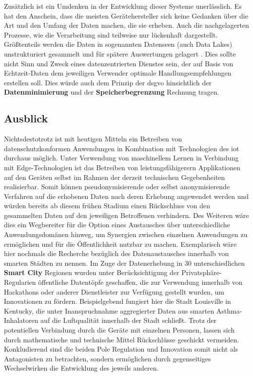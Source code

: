 Zusätzlich ist ein Umdenken in der Entwicklung dieser Systeme unerlässlich. Es hat den Anschein, dass die meisten Gerätehersteller sich keine Gedanken über die Art und den Umfang der Daten machen, die sie erheben. Auch die nachgelagerten Prozesse, wie die Verarbeitung sind teilweise nur lückenhaft dargestellt. Größtenteils werden die Daten in sogenannten Datenseen (auch Data Lakes) unstrukturiert gesammelt und für spätere Auswertungen gelagert \cite{BCG2020}. Dies sollte nicht Sinn und Zweck eines datenzentrierten Dienstes sein, der auf Basis von Echtzeit-Daten dem jeweiligen Verwender optimale Handlungsempfehlungen erstellen soll. Dies würde auch dem Prinzip der \ac{dsgvo} hinsichtlich der \textbf{Datenminimierung} und der \textbf{Speicherbegrenzung} Rechnung tragen. 

\subsection{Ausblick}
\label{sec:Zusammenfassung:ssec:Ausblick}

Nichtsdestotrotz ist mit heutigen Mitteln ein Betreiben von datenschutzkonformen Anwendungen in Kombination mit Technologien des \ac{iot} durchaus möglich. Unter Verwendung von maschinellem Lernen in Verbindung mit Edge-Technologien ist das Betreiben von leistungsfähigerern Applikationen auf den Geräten selbst im Rahmen der derzeit technischen Gegebenheiten realisierbar. 
Somit können pseudonymisierende oder selbst anonymisierende Verfahren auf die erhobenen Daten nach deren Erhebung angewendet werden und würden bereits ab diesem frühen Stadium einen Rückschluss von den gesammelten Daten auf den jeweiligen Betroffenen verhindern. 
Des Weiteren wäre dies ein Wegbereiter für die Option eines Austausches über unterschiedliche Anwendungsdomänen hinweg, um Synergien zwischen einzelnen Anwendungen zu ermöglichen und für die Öffentlichkeit nutzbar zu machen. 
Exemplarisch wäre hier nochmals die Recherche bezüglich des Datenaustausches innerhalb von smarten Städten \cite{BCG2020} zu nennen. Im Zuge der Datenerhebung in 30 unterschiedlichen \textbf{Smart City} Regionen wurden unter Berücksichtigung der Privatsphäre-Regularien öffentliche Datentöpfe geschaffen, die zur Verwendung innerhalb von Hackathons oder anderer Dienstleister zur Verfügung gestellt wurden, um Innovationen zu fördern. 
Beispielgebend fungiert hier die Stadt Louisville in Kentucky, die unter Inanspruchnahme aggregierter Daten aus smarten Asthma-Inhalatoren auf die Luftqualität innerhalb der Stadt schließt. 
Trotz der potentiellen Verbindung durch die Geräte mit einzelnen Personen, lassen sich durch mathematische und technische Mittel Rückschlüsse geschickt vermeiden. 
Konkludierend sind die beiden Pole Regulation und Innovation somit nicht als Antagonisten zu betrachten, sondern ermöglichen durch gegenseitiges Wechselwirken die Entwicklung des jeweils anderen.
